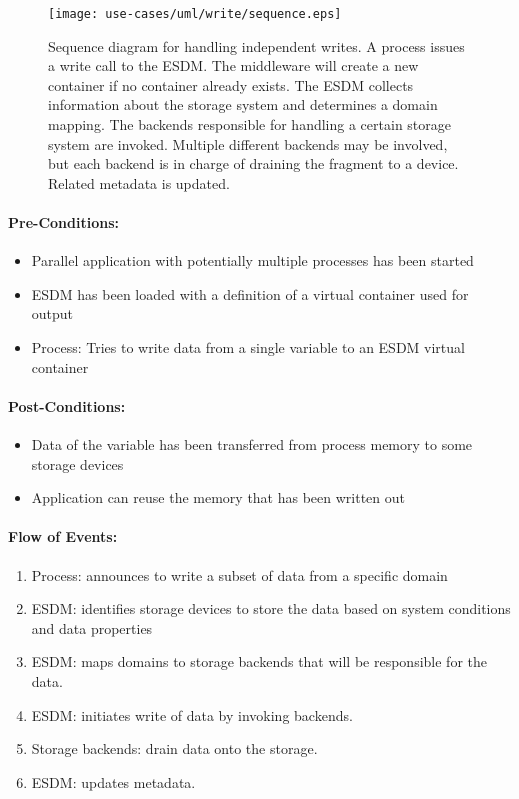 \begin{figure}
	\centering
	\texttt{[image: use-cases/uml/write/sequence.eps]}
	\caption{Sequence diagram for handling independent writes. A process issues a write call to the ESDM. The middleware will create a new container if no container already exists. The ESDM collects information about the storage system and determines a domain mapping. The backends responsible for handling a certain storage system are invoked. Multiple different backends may be involved, but each backend is in charge of draining the fragment to a device. Related metadata is updated.}
	\label{fig:sequence independent write}
\end{figure}



\paragraph{Pre-Conditions:}

\begin{itemize}
	\item Parallel application with potentially multiple processes has been started
	\item ESDM has been loaded with a definition of a virtual container used for output
	\item Process: Tries to write data from a single variable to an ESDM virtual container
\end{itemize}

\paragraph{Post-Conditions:}
  \begin{itemize}
  \item Data of the variable has been transferred from process memory to some storage devices
  \item Application can reuse the memory that has been written out
  \end{itemize}

\paragraph{Flow of Events:}
\begin{enumerate}
	\item Process: announces to write a subset of data from a specific domain
	\item ESDM: identifies storage devices to store the data based on system conditions and data properties
	\item ESDM: maps domains to storage backends that will be responsible for the data.
	\item ESDM: initiates write of data by invoking backends.
	\item Storage backends: drain data onto the storage.
	\item ESDM: updates metadata.
\end{enumerate}

